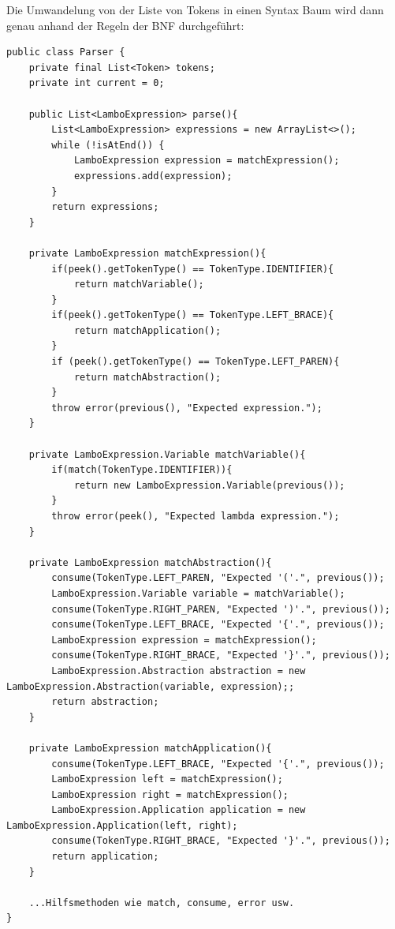 \documentclass[ngerman]{article}
\begin{document}
Die Umwandelung von der Liste von Tokens in einen Syntax Baum wird dann genau anhand der Regeln der BNF durchgeführt:
\begin{lstlisting}[caption={TODO: Referenz zu Anhang}, captionpos=b]
public class Parser {
    private final List<Token> tokens;
    private int current = 0;

    public List<LamboExpression> parse(){
        List<LamboExpression> expressions = new ArrayList<>();
        while (!isAtEnd()) {
            LamboExpression expression = matchExpression();
            expressions.add(expression);
        }
        return expressions;
    }

    private LamboExpression matchExpression(){
        if(peek().getTokenType() == TokenType.IDENTIFIER){
            return matchVariable();
        }
        if(peek().getTokenType() == TokenType.LEFT_BRACE){
            return matchApplication();
        }
        if (peek().getTokenType() == TokenType.LEFT_PAREN){
            return matchAbstraction();
        }
        throw error(previous(), "Expected expression.");
    }

    private LamboExpression.Variable matchVariable(){
        if(match(TokenType.IDENTIFIER)){
            return new LamboExpression.Variable(previous());
        }
        throw error(peek(), "Expected lambda expression.");
    }

    private LamboExpression matchAbstraction(){
        consume(TokenType.LEFT_PAREN, "Expected '('.", previous());
        LamboExpression.Variable variable = matchVariable();
        consume(TokenType.RIGHT_PAREN, "Expected ')'.", previous());
        consume(TokenType.LEFT_BRACE, "Expected '{'.", previous());
        LamboExpression expression = matchExpression();
        consume(TokenType.RIGHT_BRACE, "Expected '}'.", previous());
        LamboExpression.Abstraction abstraction = new LamboExpression.Abstraction(variable, expression);;
        return abstraction;
    }

    private LamboExpression matchApplication(){
        consume(TokenType.LEFT_BRACE, "Expected '{'.", previous());
        LamboExpression left = matchExpression();
        LamboExpression right = matchExpression();
        LamboExpression.Application application = new LamboExpression.Application(left, right);
        consume(TokenType.RIGHT_BRACE, "Expected '}'.", previous());
        return application;
    }

    ...Hilfsmethoden wie match, consume, error usw.
}
\end{lstlisting}
\end{document}
